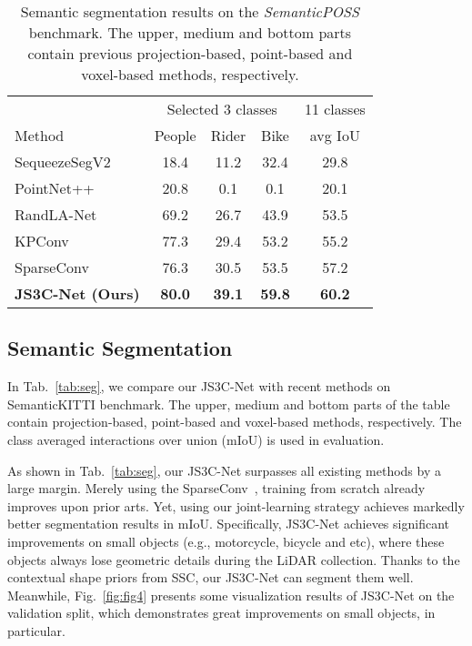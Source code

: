 \documentclass[letterpaper]{article} \usepackage{aaai21}  \usepackage{times}  \usepackage{helvet} \usepackage{courier}  \usepackage[hyphens]{url}  \usepackage{graphicx} \urlstyle{rm} \def\UrlFont{\rm}  \usepackage{natbib}  \usepackage{booktabs}
\begin{document}
\begin{table}
	\small
		\caption{Semantic segmentation results on the \textit{SemanticPOSS} benchmark. The upper, medium and bottom parts contain previous projection-based, point-based and voxel-based methods, respectively.
		}
		\begin{center}
		\begin{tabular}{l|ccc|c}
    		\hline
    		&
    		\multicolumn{3}{c|}{Selected 3 classes}
    		&11 classes 
    		\\
    		Method
    		&{People}
    		&{Rider}
    		&{Bike}
    		&{avg IoU} \\
    		\hline
    		\hline
    		SequeezeSegV2 & 18.4 &11.2&32.4 &29.8 \\\hline
        	PointNet++ & 20.8& 0.1& 0.1 &20.1 \\




    		RandLA-Net & 69.2 & 26.7 & 43.9 & 53.5 \\
    		KPConv & 77.3 & 29.4 & 53.2 &55.2 \\
    		\hline
    		SparseConv &76.3 &30.5 &53.5  &57.2\\
    		\textbf{JS3C-Net (Ours)} & \textbf{80.0} & \textbf{39.1} &\textbf{59.8} & \textbf{60.2}\\
    		\hline
	    \end{tabular}
		\end{center}
		
		\label{tab:seg_pose}
\end{table}
	

	
	\subsection{Semantic Segmentation}
	
	In Tab.~\ref{tab:seg}, we compare our JS3C-Net with recent methods on SemanticKITTI benchmark.
The upper, medium and bottom parts of the table contain projection-based, point-based and voxel-based methods, respectively. 
The class averaged interactions over union (mIoU) is used in evaluation. 
	
	As shown in Tab.~\ref{tab:seg}, our JS3C-Net surpasses all existing methods by a large margin. 
Merely using the SparseConv~\cite{graham2017submanifold}, training from scratch already improves upon prior arts.
Yet, using our joint-learning strategy achieves markedly better segmentation results in mIoU.
Specifically, JS3C-Net achieves significant improvements on small objects (e.g., motorcycle, bicycle and etc), where these objects always lose geometric details during the LiDAR collection. 
Thanks to the contextual shape priors from SSC, our JS3C-Net
	can segment them well.
Meanwhile, Fig.~\ref{fig:fig4} presents some visualization results of JS3C-Net on the validation split, which demonstrates great improvements on small objects, in particular.
	
\end{document}

